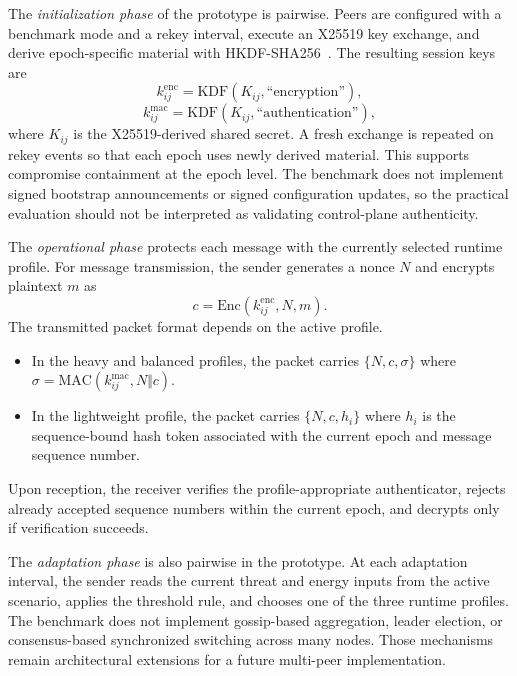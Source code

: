 The \emph{initialization phase} of the prototype is pairwise. Peers are configured with a benchmark mode and a rekey interval, execute an X25519 key exchange, and derive epoch-specific material with HKDF-SHA256~\cite{rfc7748,rfc5869}. The resulting session keys are
\begin{equation}
k^{\mathrm{enc}}_{ij} = \mathrm{KDF}(K_{ij}, \text{``encryption''}),
\label{eq:kdf_enc}
\end{equation}
\begin{equation}
k^{\mathrm{mac}}_{ij} = \mathrm{KDF}(K_{ij}, \text{``authentication''}),
\label{eq:kdf_mac}
\end{equation}
where $K_{ij}$ is the X25519-derived shared secret. A fresh exchange is repeated on rekey events so that each epoch uses newly derived material. This supports compromise containment at the epoch level. The benchmark does not implement signed bootstrap announcements or signed configuration updates, so the practical evaluation should not be interpreted as validating control-plane authenticity.

The \emph{operational phase} protects each message with the currently selected runtime profile. For message transmission, the sender generates a nonce $N$ and encrypts plaintext $m$ as
\begin{equation}
c = \mathrm{Enc}\!\left(k^{\mathrm{enc}}_{ij}, N, m\right).
\label{eq:encrypt_msg}
\end{equation}
The transmitted packet format depends on the active profile.
\begin{itemize}
  \item In the heavy and balanced profiles, the packet carries $\{N, c, \sigma\}$ where $\sigma=\mathrm{MAC}(k^{\mathrm{mac}}_{ij}, N \Vert c)$.
  \item In the lightweight profile, the packet carries $\{N, c, h_i\}$ where $h_i$ is the sequence-bound hash token associated with the current epoch and message sequence number.
\end{itemize}
Upon reception, the receiver verifies the profile-appropriate authenticator, rejects already accepted sequence numbers within the current epoch, and decrypts only if verification succeeds.

The \emph{adaptation phase} is also pairwise in the prototype. At each adaptation interval, the sender reads the current threat and energy inputs from the active scenario, applies the threshold rule, and chooses one of the three runtime profiles. The benchmark does not implement gossip-based aggregation, leader election, or consensus-based synchronized switching across many nodes. Those mechanisms remain architectural extensions for a future multi-peer implementation.

